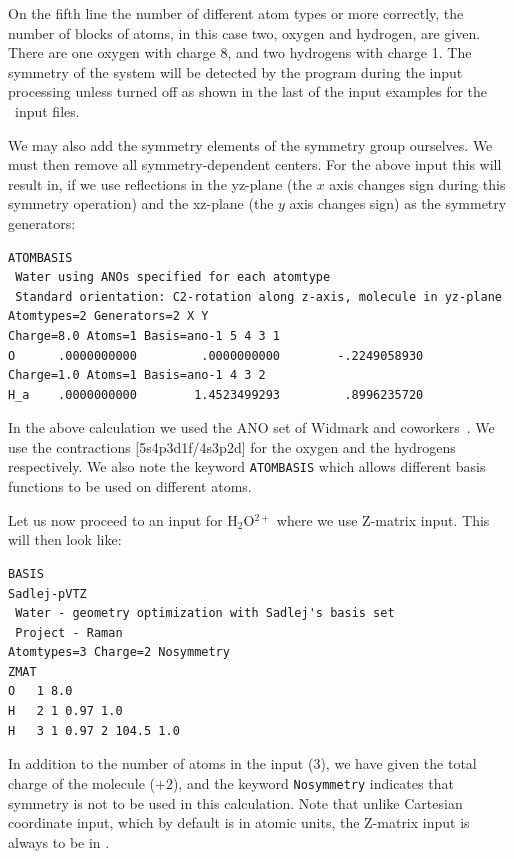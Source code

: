On the fifth line the number of different atom types or more correctly,
the number of  blocks of atoms,
in this case two, oxygen and hydrogen, are given. There are one oxygen with
charge 8, and two hydrogens with charge 1. The symmetry of the system
will be detected by the program during the input processing unless
turned off as shown in the last of the input examples for the \molinp\
input files.

We may also add the symmetry elements of the
symmetry group\index{symmetry!group} ourselves. We must
then remove all symmetry-dependent centers. For the above input this
will result in, if we use reflections in the yz-plane (the $x$ axis changes sign during this
symmetry operation) and the xz-plane (the $y$ axis changes sign) as the symmetry generators: 

\begin{verbatim}
ATOMBASIS
 Water using ANOs specified for each atomtype
 Standard orientation: C2-rotation along z-axis, molecule in yz-plane
Atomtypes=2 Generators=2 X Y
Charge=8.0 Atoms=1 Basis=ano-1 5 4 3 1
O      .0000000000         .0000000000        -.2249058930
Charge=1.0 Atoms=1 Basis=ano-1 4 3 2
H_a    .0000000000        1.4523499293         .8996235720
\end{verbatim}

In the above calculation we used the ANO set of
Widmark and
coworkers~\cite{powpambortca77,powbjpbortca79}.
We use the contractions
[5s4p3d1f/4s3p2d] for the oxygen and the hydrogens respectively. We
also note the keyword \verb|ATOMBASIS|\index{ATOMBASIS} which allows
different basis functions to be used on different atoms.

Let us now proceed to an input for H$_{2}$O$^{2+}$ where we use
Z-matrix input. This will then look like:

\begin{verbatim}
BASIS
Sadlej-pVTZ
 Water - geometry optimization with Sadlej's basis set
 Project - Raman
Atomtypes=3 Charge=2 Nosymmetry
ZMAT
O   1 8.0
H   2 1 0.97 1.0
H   3 1 0.97 2 104.5 1.0
\end{verbatim}

In addition to the number of atoms in the input (3), we have given the
total charge\index{molecular charge} of the
molecule ($+2$), and the keyword \verb|Nosymmetry| indicates that
symmetry is not to be used in this calculation. Note that
unlike Cartesian coordinate input, which by default is in atomic units, the
Z-matrix input is always to be in \angstrom{}.

